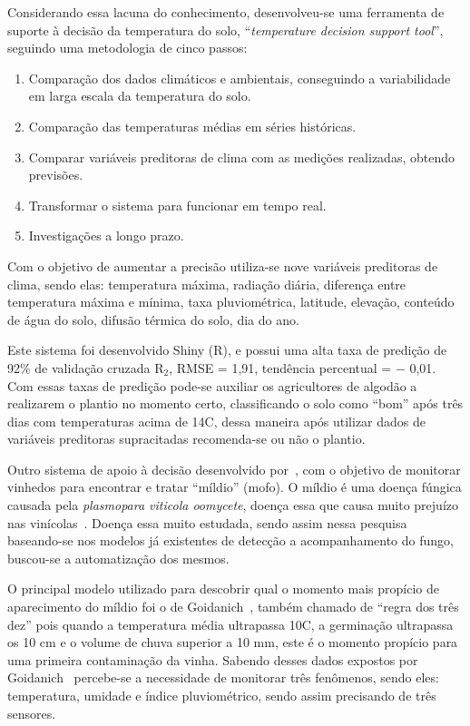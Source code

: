 \documentclass[
	article,			%
	12pt,				%
	oneside,			%
	a4paper,			%
	english,			%
	brazil,				%
	sumario=tradicional
	]{abntex2}
\begin{document}
Considerando essa lacuna do conhecimento, desenvolveu-se uma ferramenta de suporte à decisão da temperatura do solo, ``\textit{temperature decision support tool}'', seguindo uma metodologia de cinco passos:
\begin{enumerate}
  \item Comparação dos dados climáticos e ambientais, conseguindo a variabilidade em larga escala da temperatura do solo.

  \item Comparação das temperaturas médias em séries históricas.
  \item Comparar variáveis preditoras de clima com as medições realizadas, obtendo previsões.
  \item Transformar o sistema para funcionar em tempo real.
  \item Investigações a longo prazo.
\end{enumerate}

Com o objetivo de aumentar a precisão utiliza-se nove variáveis preditoras de clima, sendo elas: temperatura máxima, radiação diária, diferença entre temperatura máxima e mínima, taxa pluviométrica, latitude, elevação, conteúdo de água do solo, difusão térmica do solo, dia do ano.

Este sistema foi desenvolvido Shiny (R), e possui uma alta taxa de predição de 92\% de validação cruzada R$_{2}$, RMSE = 1,91, tendência percentual = $-$ 0,01.
Com essas taxas de predição pode-se auxiliar os agricultores de algodão a realizarem o plantio no momento certo, classificando o solo como ``bom'' após três dias com temperaturas acima de 14\textdegree C, dessa maneira após utilizar dados de variáveis preditoras supracitadas recomenda-se ou não o plantio.

Outro sistema de apoio à decisão desenvolvido por~\citeauthor{2}, com o objetivo de monitorar vinhedos para encontrar e tratar ``míldio'' (mofo).
O míldio é uma doença fúngica causada pela \textit{plasmopara viticola oomycete}, doença essa que causa muito prejuízo nas vinícolas~\cite{2}. Doença essa muito estudada, sendo assim nessa pesquisa baseando-se nos modelos já existentes de detecção a acompanhamento do fungo, buscou-se a automatização dos mesmos.

O principal modelo utilizado para descobrir qual o momento mais propício de aparecimento do míldio foi o de Goidanich~\cite{detectando_milidio}, também chamado de ``regra dos três dez'' pois quando a temperatura média ultrapassa 10\textdegree C, a germinação ultrapassa os 10 cm e o volume de chuva superior a 10 mm, este é o momento propício para uma primeira contaminação da vinha.
Sabendo desses dados expostos por Goidanich~\cite{detectando_milidio} percebe-se a necessidade de monitorar três fenômenos, sendo eles: temperatura, umidade e índice pluviométrico, sendo assim precisando de três sensores.
\end{document}
